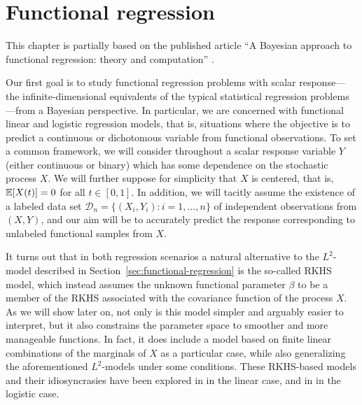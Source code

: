 \chapter{Functional regression}\label{ch:functional-regression}

\begin{flushannotation}
  {This chapter is partially based on the published article
  ``A Bayesian approach to functional regression: theory and computation''
  \citep{berrendero2025bayesian}.}
\end{flushannotation}

\noindent Our first goal is to study functional regression problems with scalar response---the infinite-dimensional equivalents of the typical statistical regression problems---from a Bayesian perspective. In particular, we are concerned with functional linear and logistic regression models, that is, situations where the objective is to predict a continuous or dichotomous variable from functional observations. To set a common framework, we will consider throughout a scalar response variable \(Y\) (either continuous or binary) which has some dependence on the stochastic process \(X\). We will further suppose for simplicity that \(X\) is centered, that is, \(\mathbb{E}[X(t)]=0\) for all \(t\in[0,1]\). In addition, we will tacitly assume the existence of a labeled data set \(\mathcal D_n =\{(X_i, Y_i): i=1,\dots, n\}\) of independent observations from \((X, Y)\), and our aim will be to accurately predict the response corresponding to unlabeled functional samples from \(X\).

It turns out that in both regression scenarios a natural alternative to the \(L^2\)-model described in Section~\ref{sec:functional-regression} is the so-called \acs{RKHS} model, which instead assumes the unknown functional parameter \(\beta\) to be a member of the \acs{RKHS} associated with the covariance function of the process \(X\). As we will show later on, not only is this model simpler and arguably easier to interpret, but it also constrains the parameter space to smoother and more manageable functions. In fact, it does include a model based on finite linear combinations of the marginals of \(X\) as a particular case, while also generalizing the aforementioned \(L^2\)-models under some conditions. These \acs{RKHS}-based models and their idiosyncrasies have been explored in \citet{berrendero2019rkhs, berrendero2024functional} in the linear case, and in \citet{berrendero2023functional} in the logistic case.


